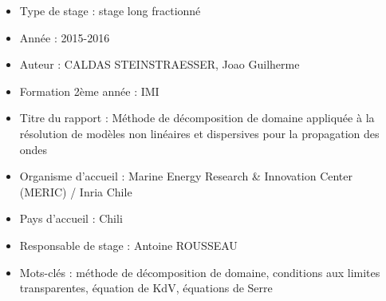 \begin{itemize}

\item Type de stage : stage long fractionné

\item Année : 2015-2016

\item Auteur : CALDAS STEINSTRAESSER, Joao Guilherme

\item Formation 2ème année : IMI

\item Titre du rapport : Méthode de décomposition de domaine appliquée à la résolution de modèles non linéaires et dispersives pour la propagation des ondes

\item Organisme d’accueil : Marine Energy Research \& Innovation Center (MERIC) / Inria Chile

\item Pays d’accueil : Chili

\item Responsable de stage : Antoine ROUSSEAU

\item Mots-clés : méthode de décomposition de domaine, conditions aux limites transparentes, équation de KdV, équations de Serre

\end{itemize}
